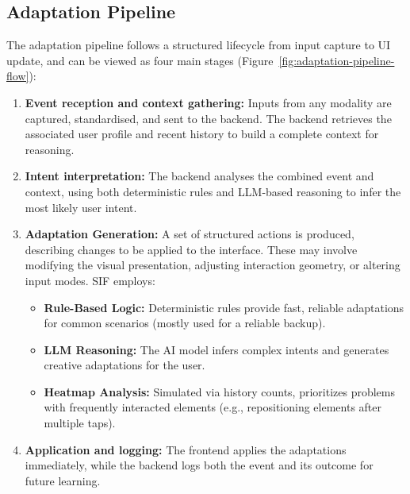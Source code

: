 \documentclass[openany]{book}
\begin{document}
\subsection{Adaptation Pipeline}
The adaptation pipeline follows a structured lifecycle from input capture to UI update, and can be viewed as four main stages (Figure~\ref{fig:adaptation-pipeline-flow}):
\begin{enumerate}
    \item \textbf{Event reception and context gathering:} Inputs from any modality are captured, standardised, and sent to the backend. The backend retrieves the associated user profile and recent history to build a complete context for reasoning.
    \item \textbf{Intent interpretation:} The backend analyses the combined event and context, using both deterministic rules and LLM-based reasoning to infer the most likely user intent.
    \item \textbf{Adaptation Generation:} A set of structured actions is produced, describing changes to be applied to the interface. These may involve modifying the visual presentation, adjusting interaction geometry, or altering input modes. SIF employs:
        \begin{itemize}
            \item \textbf{Rule-Based Logic:} Deterministic rules provide fast, reliable adaptations for common scenarios (mostly used for a reliable backup).
            \item \textbf{LLM Reasoning:} The AI model infers complex intents and generates creative adaptations for the user.
            \item \textbf{Heatmap Analysis:} Simulated via history counts, prioritizes problems with frequently interacted elements (e.g., repositioning elements after multiple taps).
        \end{itemize}
    \item \textbf{Application and logging:} The frontend applies the adaptations immediately, while the backend logs both the event and its outcome for future learning.
\end{enumerate}
\end{document}
